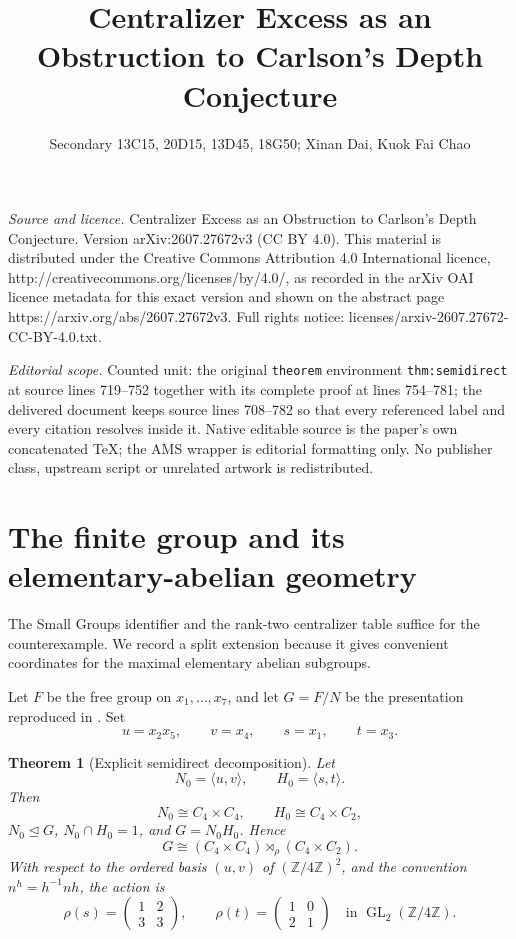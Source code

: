 \documentclass[10pt,a4paper]{amsart}
\newtheorem{theorem}{Theorem}[section]
\newcommand{\Z}{\mathbb Z}
\begin{document}
\title[Centralizer Excess as an Obstruction to Carlson's Depth Conj]{Centralizer Excess as an Obstruction to Carlson's Depth Conjecture}
\author{Secondary 13C15, 20D15, 13D45, 18G50; Xinan Dai, Kuok Fai Chao}
\date{}
\maketitle
\noindent\emph{Source and licence.} Centralizer Excess as an Obstruction to Carlson's Depth Conjecture. Version arXiv:2607.27672v3 (CC BY 4.0). This material is distributed under the Creative Commons Attribution 4.0 International licence, http://creativecommons.org/licenses/by/4.0/, as recorded in the arXiv OAI licence metadata for this exact version and shown on the abstract page https://arxiv.org/abs/2607.27672v3. Full rights notice: licenses/arxiv-2607.27672-CC-BY-4.0.txt.\par\smallskip
\noindent\textit{Editorial scope.} Counted unit: the original \texttt{theorem} environment \texttt{thm:semidirect} at source lines 719--752 together with its complete proof at lines 754--781; the delivered document keeps source lines 708--782 so that every referenced label and every citation resolves inside it. Native editable source is the paper's own concatenated TeX; the AMS wrapper is editorial formatting only. No publisher class, upstream script or unrelated artwork is redistributed.
\section{The finite group and its elementary-abelian geometry}
\label{sec:group}

The Small Groups identifier and the rank-two centralizer table suffice for the counterexample.  We record a split extension because it gives convenient coordinates for the maximal elementary abelian subgroups.

Let \(F\) be the free group on \(x_1,\dots,x_7\), and let \(G=F/N\) be the presentation reproduced in \cite[Appendix~A.1]{DaiEtAl2026}.  Set
\[
u=x_2x_5,\qquad v=x_4,
\qquad s=x_1,\qquad t=x_3.
\]


\begin{theorem}[Explicit semidirect decomposition]
\label{thm:semidirect}
Let
\[
N_0=\langle u,v\rangle,
\qquad
H_0=\langle s,t\rangle.
\]
Then
\[
N_0\cong C_4\times C_4,
\qquad
H_0\cong C_4\times C_2,
\]
\(N_0\trianglelefteq G\), \(N_0\cap H_0=1\), and \(G=N_0H_0\).  Hence
\[
G\cong(C_4\times C_4)\rtimes_{\rho}(C_4\times C_2).
\]
With respect to the ordered basis \((u,v)\) of \((\Z/4\Z)^2\), and the convention \(n^h=h^{-1}nh\), the action is
\[
\rho(s)=
\begin{pmatrix}
1&2\\
3&3
\end{pmatrix},
\qquad
\rho(t)=
\begin{pmatrix}
1&0\\
2&1
\end{pmatrix}
\quad\text{in }\operatorname{GL}_2(\Z/4\Z).
\]
\end{theorem}
\end{document}

